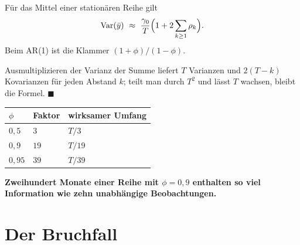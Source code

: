 \begin{merksatz}
Für das Mittel einer stationären Reihe gilt
\[ \operatorname{Var}(\bar y) \ \approx\ \frac{\gamma_0}{T}\Bigl(1 + 2\sum_{k\ge1}\rho_k\Bigr) . \]
Beim AR(1) ist die Klammer $(1+\phi)/(1-\phi)$.

Ausmultiplizieren der Varianz der Summe liefert $T$ Varianzen und $2(T-k)$ Kovarianzen für jeden Abstand $k$; teilt man durch $T^{2}$ und lässt $T$ wachsen, bleibt die Formel. $\blacksquare$

\begin{center}
{\small
\renewcommand{\arraystretch}{1.48}
\begin{tabular}{@{}P{1.4cm}P{2.4cm}P{3.2cm}@{}}
\toprule
$\phi$ & \textbf{Faktor} & \textbf{wirksamer Umfang}\\
\midrule
$0{,}5$ & $3$ & $T/3$\\
$0{,}9$ & $19$ & $T/19$\\
$0{,}95$ & $39$ & $T/39$\\
\bottomrule
\end{tabular}}
\end{center}

\begin{center}
\begin{minipage}{0.9\textwidth}
\textbf{Zweihundert Monate einer Reihe mit $\phi = 0{,}9$ enthalten so viel Information wie zehn unabhängige Beobachtungen.}
\end{minipage}
\end{center}

\begin{center}
\begin{minipage}{0.88\textwidth}
\end{minipage}
\end{center}
\end{merksatz}

\section{Der Bruchfall}

